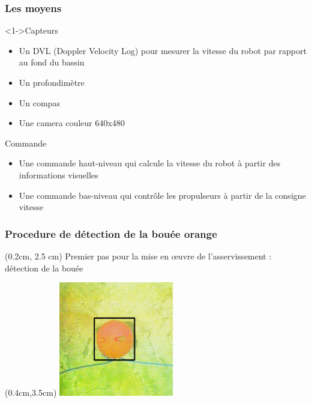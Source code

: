 \documentclass[10pt]{beamer}
\begin{document}
\begin{frame}
\frametitle{Les moyens}
\begin{block}<1->{Capteurs}
\begin{itemize}
\item Un DVL (Doppler Velocity Log) pour mesurer la vitesse du robot par rapport au fond du bassin
\item Un profondimètre
\item Un compas
\item Une camera couleur 640x480
\end{itemize}
\end{block}
\begin{block}{Commande}
\begin{itemize}
\item Une commande haut-niveau qui calcule la vitesse du robot à partir des informations visuelles
\item Une commande bas-niveau qui contrôle les propulseurs à partir de la consigne vitesse \footnotemark
\end{itemize}
\end{block}
\end{frame}

\begin{frame}
\frametitle{Procedure de détection de la bouée orange}
\begin{textblock*}{12.4cm}(0.2cm, 2.5 cm) %
Premier pas pour la mise en œuvre de l'asservissement : détection de la bouée 
\end{textblock*}
\begin{textblock*}{12cm}(0.4cm,3.5cm) %
\centering
\includegraphics[height=5cm, keepaspectratio]{Pictures/orange_ball.png}
\end{textblock*}
\end{frame}
\end{document}
